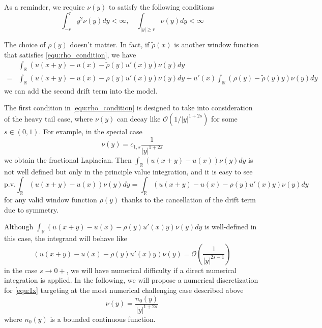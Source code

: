 \documentclass[3p,,preprint,12pt]{elsarticle}
\newcommand{\RR}[0]{\mathbb{R}}
\theoremstyle{definition}
\begin{document}
As a reminder, we require $\nu(y)$ to satisfy the following conditions
\begin{equation}\label{equ:ny}
	\int_{-r}^ry^2\nu(y)dy <\infty, \quad \int_{|y|\geq r} \nu(y)dy<\infty
\end{equation} 

The choice of $\rho(y)$ doesn't matter. In fact, if $\tilde\rho(x)$ is another window function that satisfies \cref{equ:rho_condition}, we have
\begin{align}
	&\int_{\RR}(u(x+y)-u(x)-\tilde\rho(y)u'(x)y)\nu(y)dy \\
	=& \int_{\RR}(u(x+y)-u(x)-\rho(y)u'(x)y)\nu(y)dy + u'(x)\int_{\RR}(\rho(y)-\tilde\rho(y)y)\nu(y)dy
\end{align}
we can add the second drift term into the model. 

The first condition in \cref{equ:rho_condition} is designed to take into consideration of the heavy tail case, where $\nu(y)$ can decay like $\mathcal{O}(1/|y|^{1+2s})$ for some $s\in (0,1)$. For example, in the special case
\begin{equation}
	\nu(y) = c_{1,s}\frac{1}{|y|^{1+2s}}
\end{equation}
we obtain the fractional Laplacian. Then $\int_{\RR}(u(x+y)-u(x))\nu(y)dy$ is not well defined but only in the principle value integration, and it is easy to see
\begin{equation}
	\mathrm{p.v.}\int_{\RR}(u(x+y)-u(x))\nu(y)dy = \int_{\RR}(u(x+y)-u(x)-\rho(y)u'(x)y)\nu(y)dy
\end{equation}
for any valid window function $\rho(y)$ thanks to the cancellation of the drift term due to symmetry. 

Although $\int_{\RR}(u(x+y)-u(x)-\rho(y)u'(x)y)\nu(y)dy$ is well-defined in this case, the integrand will behave like 
\begin{equation}
	(u(x+y)-u(x)-\rho(y)u'(x)y)\nu(y) = \mathcal{O}\left(\frac{1}{|y|^{2s-1}}\right)
\end{equation}
in the case $s\rightarrow 0+$, we will have numerical difficulty if a direct numerical integration is applied. In the following, we will propose a numerical discretization for \cref{equ:Ix} targeting at the most numerical challenging case described above 
\begin{equation}\label{equ:ny2}
	\nu(y) = \frac{n_0(y)}{|y|^{1+2s}}
\end{equation} 
where $n_0(y)$ is a bounded continuous function. 
\end{document}
